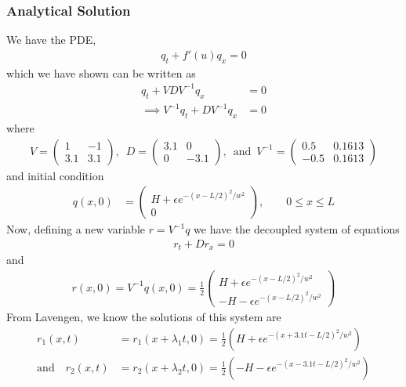 \subsubsection{Analytical Solution}
We have the PDE, 
\begin{align*}
q_t + f'(u) q_x = 0
\end{align*}
which we have shown can be written as 
\begin{align*}
q_t + V D V^{-1} q_x &= 0 \\
\implies V^{-1} q_t + D V^{-1} q_x &= 0
\end{align*}
where 
\begin{align*}
 V = \begin{pmatrix}
1 & -1 \\
3.1 & 3.1
\end{pmatrix}, \enspace D= \begin{pmatrix}
3.1 & 0 \\
0 & -3.1
\end{pmatrix},  \enspace \text{and} \enspace V^{-1} = \begin{pmatrix}
0.5 & 0.1613 \\
-0.5 & 0.1613
\end{pmatrix}
\end{align*} and initial condition
\begin{align*}
q(x,0) &= \begin{pmatrix}
H + \epsilon e^{-(x-L/2)^2/w^2} \\
0
\end{pmatrix}, \quad \quad 0 \leq x \leq L
\end{align*}
Now, defining a new variable $r = V^{-1} q$ we have the decoupled system of equations
\begin{align*}
r_t + Dr_x = 0
\end{align*}
and 
\begin{align*}
r(x,0) = V^{-1} q(x,0) = \frac{1}{2} \begin{pmatrix}
H + \epsilon e^{-(x-L/2)^2/w^2} \\
-H - \epsilon e^{-(x-L/2)^2/w^2}
\end{pmatrix} 
\end{align*}
From Lavengen, we know the solutions of this system are 
\begin{align*}
	r_1(x,t)&=r_1(x+\lambda_1t,0)=\frac{1}{2} (H + \epsilon e^{-(x+3.1t-L/2)^2/w^2}) \\
	\text{and} \quad r_2(x,t)&=r_2(x+\lambda_2t,0)= \frac{1}{2}(-H - \epsilon e^{-(x-3.1t-L/2)^2/w^2})
\end{align*} 
